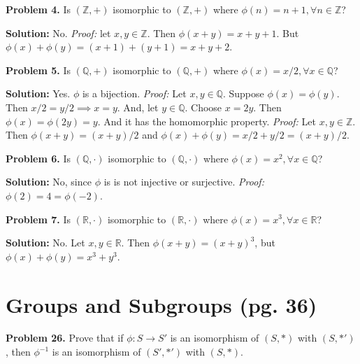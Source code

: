 \documentclass[12pt, letterpaper]{article}
\newenvironment{problem}
    [1]
    {\noindent \textbf{Problem #1.}}
    {\vspace{3mm}}
\newenvironment{solution}
    [0]
    {\noindent \textbf{Solution:}} 
    {\vspace{3mm}}
\begin{document}
    \begin{problem}{4}
        Is $(\mathbb{Z}, +)$ isomorphic to $(\mathbb{Z}, +)$ where $\phi(n)=n + 1, \forall n \in \mathbb{Z}$?
    \end{problem}

    \begin{solution}
        No. \emph{Proof:} let $x, y \in \mathbb{Z}$. Then $\phi(x + y)= x + y + 1$. But $\phi(x)+\phi(y)=
        (x + 1) + (y + 1) = x + y + 2$.
    \end{solution}

    \begin{problem}{5}
        Is $(\mathbb{Q}, +)$ isomorphic to $(\mathbb{Q}, +)$ where $\phi(x)=x/2, \forall x \in \mathbb{Q}$?
    \end{problem}

    \begin{solution}
        Yes. $\phi$ is a bijection. \emph{Proof:} Let $x, y \in \mathbb{Q}$. Suppose $\phi(x) = \phi(y)$.
        Then $x/2 = y/2 \implies x = y$. And, let $y \in \mathbb{Q}$. Choose $x = 2y$. Then $\phi(x) = 
        \phi(2y) = y$. And it has the homomorphic property. \emph{Proof:} Let $x, y \in \mathbb{Z}$. 
        Then $\phi(x + y)=(x+y)/2$ and $\phi(x)+\phi(y)=x/2+y/2=(x+y)/2$.
    \end{solution}

    \begin{problem}{6}
        Is $(\mathbb{Q}, \cdot)$ isomorphic to $(\mathbb{Q}, \cdot)$ where $\phi(x)=x^2, \forall x \in \mathbb{Q}$?
    \end{problem}

    \begin{solution}
        No, since $\phi$ is is not injective or surjective. \emph{Proof:} $\phi(2) = 4 = \phi(-2)$. 
    \end{solution}

    \begin{problem}{7}
        Is $(\mathbb{R}, \cdot)$ isomorphic to $(\mathbb{R}, \cdot)$ where $\phi(x)=x^3, \forall x \in \mathbb{R}$?
    \end{problem}

    \begin{solution}
        No. Let $x, y \in \mathbb{R}$. Then $\phi(x + y) = (x+y)^3$, but $\phi(x)+\phi(y)=x^3+y^3$.
    \end{solution}
\section{Groups and Subgroups (pg. 36)} 
    \begin{problem}{26}
        Prove that if $\phi: S \rightarrow S'$ is an isomorphism of $(S, *)$ with $(S, *')$,
        then $\phi^{-1}$ is an isomorphism of $(S', *')$ with $(S, *)$.
    \end{problem}
\end{document}
